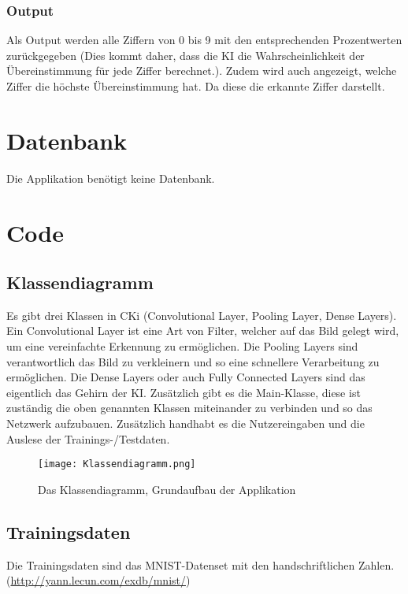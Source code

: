 \subsubsection{Output}
\label{sec:DesignUseOutput}
Als Output werden alle Ziffern von 0 bis 9 mit den entsprechenden Prozentwerten zurückgegeben (Dies kommt daher, dass die KI die Wahrscheinlichkeit der Übereinstimmung für jede Ziffer berechnet.). Zudem wird auch angezeigt, welche Ziffer die höchste Übereinstimmung hat. Da diese die erkannte Ziffer darstellt.

\section{Datenbank}
\label{sec:DesignDatenbank}
Die Applikation benötigt keine Datenbank.

\section{Code}
\label{sec:DesignCode}
\subsection{Klassendiagramm}
\label{sec:DesignKlassendiagramm}
 Es gibt drei Klassen in CKi (Convolutional Layer, Pooling Layer, Dense Layers). Ein Convolutional Layer ist eine Art von Filter, welcher auf das Bild gelegt wird, um eine vereinfachte Erkennung zu ermöglichen. Die Pooling Layers sind verantwortlich das Bild zu verkleinern und so eine schnellere Verarbeitung zu ermöglichen. Die Dense Layers oder auch Fully Connected Layers sind das eigentlich das Gehirn der KI. Zusätzlich gibt es die Main-Klasse, diese ist zuständig die oben genannten Klassen miteinander zu verbinden und so das Netzwerk aufzubauen. Zusätzlich handhabt es die Nutzereingaben und die Auslese der Trainings-/Testdaten. 

\begin{figure}[H]
\centering
\texttt{[image: Klassendiagramm.png]}
\caption{Das Klassendiagramm, Grundaufbau der Applikation}
\label{fig:designklassendiagramm}
\end{figure}

\subsection{Trainingsdaten}
\label{sec:DesignTrainingsdaten}
Die Trainingsdaten sind das MNIST-Datenset mit den handschriftlichen Zahlen. (\url{http://yann.lecun.com/exdb/mnist/})

